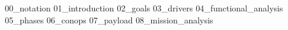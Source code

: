 {00_notation}
\pagebreak
{}
{01_introduction}
{02_goals}
{03_drivers}
{04_functional_analysis}
{05_phases}
{06_conops}
{07_payload}
{08_mission_analysis}